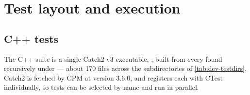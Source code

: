 \section{Test layout and execution}
\label{sec:dev-testing}

\subsection{C++ tests}

The C++ suite is a single Catch2 v3 executable, , built from
every  found recursively under  --- about 170 files
across the subdirectories of \cref{tab:dev-testdirs}. Catch2 is fetched by CPM
at version 3.6.0, and  registers each
 with CTest individually, so tests can be selected by name and
run in parallel.

